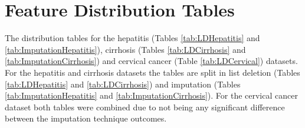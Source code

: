 \documentclass[10pt,a4paper]{report}
\begin{document}
	
	\section{Feature Distribution Tables}
	
	\label{app:DistributionTables}
	
	The distribution tables for the hepatitis (Tables \ref{tab:LDHepatitis} and \ref{tab:ImputationHepatitis}), cirrhosis (Tables \ref{tab:LDCirrhosis} and \ref{tab:ImputationCirrhosis}) and cervical cancer (Table \ref{tab:LDCervical}) datasets. For the hepatitis and cirrhosis datasets the tables are split in list deletion (Tables \ref{tab:LDHepatitis} and \ref{tab:LDCirrhosis}) and imputation (Tables \ref{tab:ImputationHepatitis} and \ref{tab:ImputationCirrhosis}). For the cervical cancer dataset both tables were combined due to not being any significant difference between the imputation technique outcomes. 
	
\end{document}
